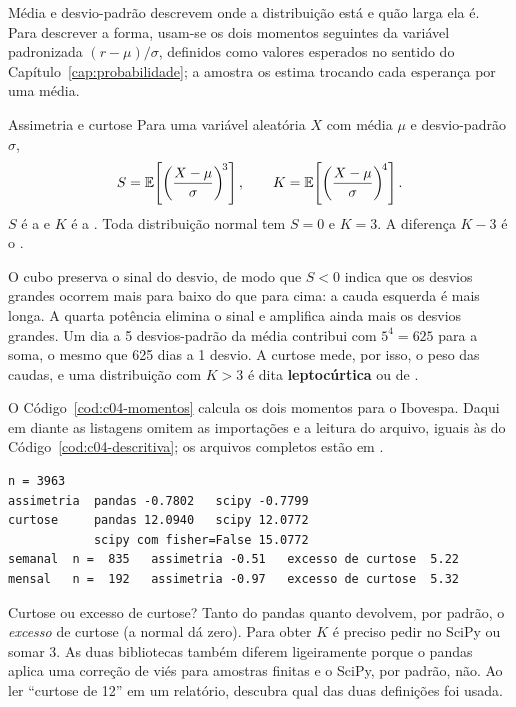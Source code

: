 Média e desvio-padrão descrevem onde a distribuição está e quão larga ela é. Para descrever a forma, usam-se os dois momentos seguintes da variável padronizada $(r - \mu)/\sigma$, definidos como valores esperados no sentido do Capítulo~\ref{cap:probabilidade}; a amostra os estima trocando cada esperança por uma média.

\begin{definicao}{Assimetria e curtose}
Para uma variável aleatória $X$ com média $\mu$ e desvio-padrão $\sigma$,
\begin{equation}
  S = \operatorname{\mathbb{E}}\!\left[\left(\frac{X-\mu}{\sigma}\right)^{\!3}\right] , \qquad
  K = \operatorname{\mathbb{E}}\!\left[\left(\frac{X-\mu}{\sigma}\right)^{\!4}\right] .
  \label{eq:c04-momentos}
\end{equation}
$S$ é a  e $K$ é a . Toda distribuição normal tem $S = 0$ e $K = 3$. A diferença $K - 3$ é o .
\end{definicao}

O cubo preserva o sinal do desvio, de modo que $S < 0$ indica que os desvios grandes ocorrem mais para baixo do que para cima: a cauda esquerda é mais longa. A quarta potência elimina o sinal e amplifica ainda mais os desvios grandes. Um dia a 5 desvios-padrão da média contribui com $5^4 = 625$ para a soma, o mesmo que 625 dias a 1 desvio. A curtose mede, por isso, o peso das caudas, e uma distribuição com $K > 3$ é dita \textbf{leptocúrtica} ou de .

O Código~\ref{cod:c04-momentos} calcula os dois momentos para o Ibovespa. Daqui em diante as listagens omitem as importações e a leitura do arquivo, iguais às do Código~\ref{cod:c04-descritiva}; os arquivos completos estão em .


\begin{lstlisting}[style=saida]
n = 3963
assimetria  pandas -0.7802   scipy -0.7799
curtose     pandas 12.0940   scipy 12.0772
            scipy com fisher=False 15.0772
semanal  n =  835   assimetria -0.51   excesso de curtose  5.22
mensal   n =  192   assimetria -0.97   excesso de curtose  5.32
\end{lstlisting}

\begin{armadilha}{Curtose ou excesso de curtose?}
Tanto  do pandas quanto  devolvem, por padrão, o \emph{excesso} de curtose (a normal dá zero). Para obter $K$ é preciso pedir  no SciPy ou somar 3. As duas bibliotecas também diferem ligeiramente porque o pandas aplica uma correção de viés para amostras finitas e o SciPy, por padrão, não. Ao ler ``curtose de 12'' em um relatório, descubra qual das duas definições foi usada.
\end{armadilha}

